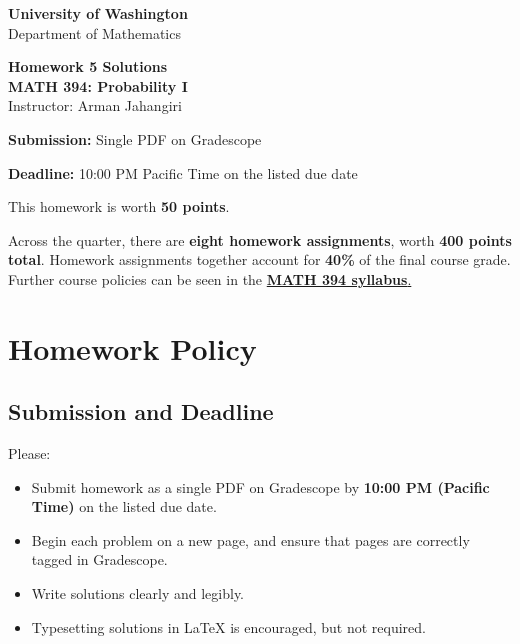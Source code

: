 \documentclass[11pt]{article}
\newcommand{\course}{MATH 394: Probability I}
\newcommand{\department}{Department of Mathematics}
\newcommand{\university}{University of Washington}
\begin{document}
\begin{titlepage}
\centering
\vspace*{1.2cm}

{\Large \textbf{\university}}\\
{\large \department}

\vspace{1.5cm}

{\Huge \color{uwpurple}\textbf{Homework 5 Solutions}}\\[0.25cm]
{\Large \textbf{\course}}\\[0.25cm]
{\large Instructor: Arman Jahangiri}

\vspace{1cm}

\begin{tcolorbox}[
    width=0.78\textwidth,
    colback=softpurple,
    colframe=uwpurple,
    boxrule=0.9pt,
    arc=3mm
]
\centering
\textbf{Submission:} Single PDF on Gradescope

\textbf{Deadline:} 10:00 PM Pacific Time on the listed due date
\end{tcolorbox}

\vspace{0.8cm}

\begin{tcolorbox}[
    width=0.86\textwidth,
    colback=white,
    colframe=uwgold,
    boxrule=0.8pt,
    arc=3mm
]
This homework is worth \textbf{50 points}.

Across the quarter, there are \textbf{eight homework assignments}, worth \textbf{400 points total}. Homework assignments together account for \textbf{40\%} of the final course grade. Further course policies can be seen in the \href{https://armanjg.github.io/MATH-394-Probability-1-v2/}{\textbf{MATH 394 syllabus}.}
\end{tcolorbox}

\vfill
\end{titlepage}

\section*{Homework Policy}

\subsection*{Submission and Deadline}

Please:

\begin{itemize}[leftmargin=*]
    \item Submit homework as a single PDF on Gradescope by \textbf{10:00 PM (Pacific Time)} on the listed due date.
    \item Begin each problem on a new page, and ensure that pages are correctly tagged in Gradescope.
    \item Write solutions clearly and legibly.
    \item Typesetting solutions in LaTeX is encouraged, but not required.
\end{itemize}
\end{document}

